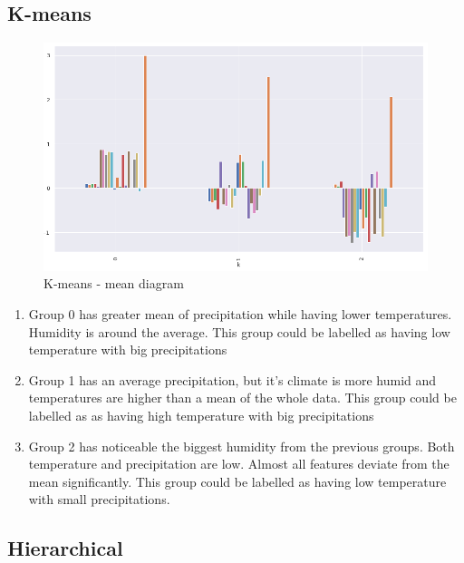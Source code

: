 \documentclass[sigconf]{acmart}
\begin{document}
\subsection{K-means}
    \begin{figure}[h]
        \includegraphics[width=\linewidth]{kmeans-mean.png}
        \centering
        \caption{K-means - mean diagram}
    \end{figure}
    \begin{enumerate}
        \item Group 0 has greater mean of precipitation while having lower temperatures. Humidity is around the average. This group could be labelled as having low temperature with big precipitations
        \item Group 1 has an average precipitation, but it's climate is more humid and temperatures are higher than a mean of the whole data. This group could be labelled as as having high temperature with big precipitations
        \item Group 2 has noticeable the biggest humidity from the previous groups. Both temperature and precipitation are low. Almost all features deviate from the mean significantly. This group could be labelled as having low temperature with small precipitations.
    \end{enumerate}
    
\subsection{Hierarchical}
\end{document}
